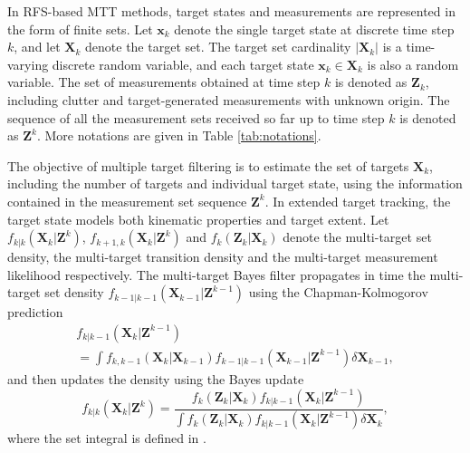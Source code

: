 \documentclass[conference]{IEEEtran}
\begin{document}
In RFS-based MTT methods, target states and measurements are represented in the form of finite sets. Let $\mathbf{x}_k$ denote the single target state at discrete time step $k$, and let $\mathbf{X}_k$ denote the target set. The target set cardinality $|\mathbf{X}_k|$ is a time-varying discrete random variable, and each target state $\mathbf{x}_k\in\mathbf{X}_k$ is also a random variable. The set of measurements obtained at time step $k$ is denoted as $\mathbf{Z}_k$, including clutter and target-generated measurements with unknown origin. The sequence of all the measurement sets received so far up to time step $k$ is denoted as $\mathbf{Z}^k$. More notations are given in Table \ref{tab:notations}.

The objective of multiple target filtering is to estimate the set of targets $\mathbf{X}_k$, including the number of targets and individual target state, using the information contained in the measurement set sequence $\mathbf{Z}^k$. In extended target tracking, the target state models both kinematic properties and target extent. Let $f_{k|k}(\mathbf{X}_k|\mathbf{Z}^k)$, $f_{k+1,k}(\mathbf{X}_k|\mathbf{Z}^k)$ and $f_k(\mathbf{Z}_k|\mathbf{X}_k)$ denote the multi-target set density, the multi-target transition density and the multi-target measurement likelihood respectively. The multi-target Bayes filter propagates in time the multi-target set density $f_{k-1|k-1}(\mathbf{X}_{k-1}|\mathbf{Z}^{k-1})$ using the Chapman-Kolmogorov prediction
\begin{multline}
f_{k|k-1}(\mathbf{X}_k|\mathbf{Z}^{k-1}) \\= \int f_{k,k-1}(\mathbf{X}_k|\mathbf{X}_{k-1})f_{k-1|k-1}(\mathbf{X}_{k-1}|\mathbf{Z}^{k-1})\delta \mathbf{X}_{k-1},
\end{multline}
and then updates the density using the Bayes update
\begin{equation}
f_{k|k}(\mathbf{X}_k|\mathbf{Z}^k) = \frac{f_{k}(\mathbf{Z}_k|\mathbf{X}_k)f_{k|k-1}(\mathbf{X}_k|\mathbf{Z}^{k-1})}{\int f_{k}(\mathbf{Z}_k|\mathbf{X}_k)f_{k|k-1}(\mathbf{X}_k|\mathbf{Z}^{k-1})\delta \mathbf{X}_k},
\end{equation}
where the set integral is defined in \cite[Sec 11.3.3]{rfs}.
\end{document}
